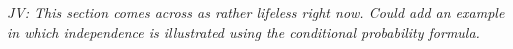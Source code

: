 \textit{JV: This section comes across as rather lifeless right now. Could add an example in which independence is illustrated using the conditional probability formula.}

